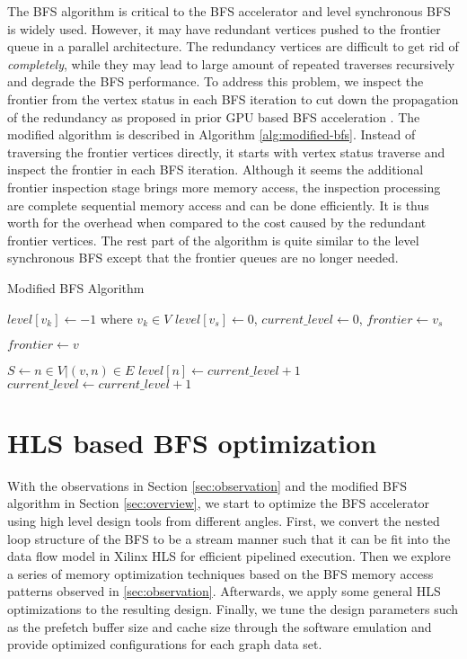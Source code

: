 The BFS algorithm is critical to the BFS accelerator 
and level synchronous BFS is widely used.  
However, it may have redundant vertices pushed to the 
frontier queue in a parallel architecture. The redundancy 
vertices are difficult to get rid of \textit{completely},
while they may lead to large 
amount of repeated traverses recursively and degrade the BFS performance.
To address this problem, we inspect the frontier from the 
vertex status in each BFS iteration to cut down the 
propagation of the redundancy as proposed in prior 
GPU based BFS acceleration \cite{liu2015enterprise}. The modified algorithm is described 
in Algorithm \ref{alg:modified-bfs}. Instead of traversing the frontier vertices directly, 
it starts with vertex status traverse and inspect the frontier 
in each BFS iteration. Although it seems the additional frontier inspection stage 
brings more memory access, the inspection processing are complete sequential 
memory access and can be done efficiently. It is thus worth for the overhead 
when compared to the cost caused by the redundant frontier vertices. 
The rest part of the algorithm is 
quite similar to the level synchronous BFS except that the frontier queues 
are no longer needed.

\begin{algorithm}
	\caption{Modified BFS Algorithm} \label{alg:modified-bfs}
    \footnotesize
	\begin{algorithmic}[1]
		\State $level[v_k] \gets -1$ where $v_k \in V$
		\State $level[v_s] \gets 0$, $current\_level \gets 0$, $frontier \gets v_s$


		\State $frontier \gets v$
		\EndIf
		\EndFor

		\State $S \gets {n \in V | (v, n) \in E}$
		\State $level[n] \gets current\_level + 1$
		\EndIf
		\EndFor
		\EndFor
		\State $current\_level \gets current\_level + 1$
		\EndWhile
		\EndProcedure
	\end{algorithmic}
\end{algorithm}

\section{HLS based BFS optimization} \label{sec:bfs-opt}
With the observations in Section \ref{sec:observation} 
and the modified BFS algorithm in Section \ref{sec:overview}, 
we start to optimize the BFS accelerator using high level design tools 
from different angles. First, we convert the nested loop structure 
of the BFS to be a stream manner such that it can be fit into the data flow model in
Xilinx HLS for efficient pipelined execution. Then we explore a series of memory optimization 
techniques based on the BFS memory access patterns observed in \ref{sec:observation}. 
Afterwards, we apply some general HLS optimizations to the resulting design. Finally, 
we tune the design parameters such as the prefetch buffer size and cache size through 
the software emulation and provide optimized configurations for each graph data set.

